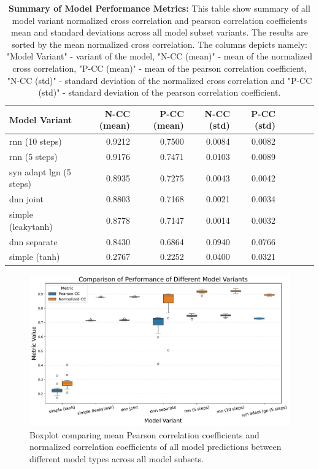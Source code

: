 \begin{table}
    \centering\footnotesize\sf
    \begin{tabular}{lrrrrrrrr}
        \toprule
        Model Variant & N-CC (mean) & P-CC (mean) & N-CC (std) & P-CC (std) \\
        \midrule
        rnn (10 steps) & 0.9212 & 0.7500 & 0.0084 & 0.0082 \\
        rnn (5 steps) & 0.9176 & 0.7471 & 0.0103 & 0.0089 \\
        syn adapt lgn (5 steps) & 0.8935 & 0.7275 & 0.0043 & 0.0042 \\
        dnn joint & 0.8803 & 0.7168 & 0.0021 & 0.0034 \\
        simple (leakytanh) & 0.8778 & 0.7147 & 0.0014 & 0.0032 \\
        dnn separate & 0.8430 & 0.6864 & 0.0940 & 0.0766 \\
        simple (tanh) & 0.2767 & 0.2252 & 0.0400 & 0.0321 \\
        \bottomrule
    \end{tabular}
        
    \caption{\textbf{Summary of Model Performance Metrics:} This table show summary of all model variant normalized cross correlation and pearson correlation coefficients mean and standard deviations across all model subset variants. The results are sorted by the mean normalized cross correlation. The columns depicts namely: "Model Variant" - variant of the model, "N-CC (mean)" - mean of the normalized cross correlation, "P-CC (mean)" - mean of the pearson correlation coefficient, "N-CC (std)" - standard deviation of the normalized cross correlation and "P-CC (std)" - standard deviation of the pearson correlation coefficient.}
    \label{tab:model_evaluation_overview_comparison}
\end{table}

\begin{figure}
    \centering
    \includegraphics[width=\linewidth]{img/plots/model_types_correlation_comparison.pdf}
    \caption{Boxplot comparing mean Pearson correlation coefficients and normalized correlation coefficients of all model predictions between different model types across all model subsets.}
    \label{fig:model_types_correlation_comparison}
\end{figure}

